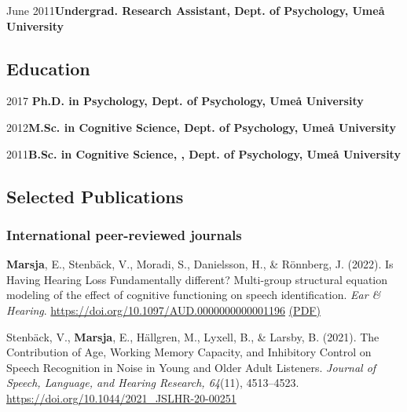 \documentclass[]{article}
\begin{document}
June
2011\hspace{0.6cm}\textbf{Undergrad. Research Assistant, Dept. of Psychology, Umeå University}\vspace{1mm}

\hypertarget{education}{%
\subsection{Education}\label{education}}

2017\hspace{0.8cm}
\textbf{Ph.D. in Psychology, Dept. of Psychology, Umeå University}\vspace{1mm}

2012\hspace{0.8cm}\textbf{M.Sc. in Cognitive Science, Dept. of Psychology, Umeå University}\vspace{1mm}

2011\hspace{0.8cm}\textbf{B.Sc. in Cognitive Science, , Dept. of Psychology, Umeå University}\vspace{1mm}

\hypertarget{selected-publications}{%
\subsection{Selected Publications}\label{selected-publications}}

\hypertarget{international-peer-reviewed-journals}{%
\subsubsection{International peer-reviewed
journals}\label{international-peer-reviewed-journals}}

\textbf{Marsja}, E., Stenbäck, V., Moradi, S., Danielsson, H., \&
Rönnberg, J. (2022). Is Having Hearing Loss Fundamentally different?
Multi-group structural equation modeling of the effect of cognitive
functioning on speech identification. \emph{Ear \& Hearing}.
\url{https://doi.org/10.1097/AUD.0000000000001196}
\href{https://bit.ly/EANDH22}{(PDF)}

Stenbäck, V., \textbf{Marsja}, E., Hällgren, M., Lyxell, B., \& Larsby,
B. (2021). The Contribution of Age, Working Memory Capacity, and
Inhibitory Control on Speech Recognition in Noise in Young and Older
Adult Listeners. \emph{Journal of Speech, Language, and Hearing
Research, 64}(11), 4513--4523.
\url{https://doi.org/10.1044/2021_JSLHR-20-00251}
\end{document}
